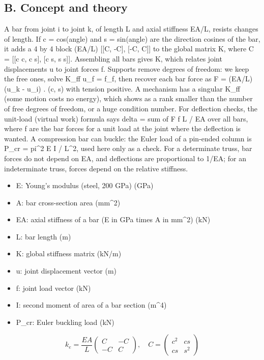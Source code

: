 \documentclass[11pt,a4paper]{article}
\begin{document}
\subsection*{B. Concept and theory}
A bar from joint i to joint k, of length L and axial stiffness EA/L, resists changes of length. If c = cos(angle) and s = sin(angle) are the direction cosines of the bar, it adds a 4 by 4 block (EA/L) [[C, -C], [-C, C]] to the global matrix K, where C = [[c c, c s], [c s, s s]]. Assembling all bars gives K, which relates joint displacements u to joint forces f. Supports remove degrees of freedom: we keep the free ones, solve K\_ff u\_f = f\_f, then recover each bar force as F = (EA/L) (u\_k - u\_i) . (c, s) with tension positive. A mechanism has a singular K\_ff (some motion costs no energy), which shows as a rank smaller than the number of free degrees of freedom, or a huge condition number. For deflection checks, the unit-load (virtual work) formula says delta = sum of F f L / EA over all bars, where f are the bar forces for a unit load at the joint where the deflection is wanted. A compression bar can buckle: the Euler load of a pin-ended column is P\_cr = pi\textasciicircum{}2 E I / L\textasciicircum{}2, used here only as a check. For a determinate truss, bar forces do not depend on EA, and deflections are proportional to 1/EA; for an indeterminate truss, forces depend on the relative stiffness.

\begin{itemize}[nosep]
\item E: Young's modulus (steel, 200 GPa) (GPa)
\item A: bar cross-section area (mm\textasciicircum{}2)
\item EA: axial stiffness of a bar (E in GPa times A in mm\textasciicircum{}2) (kN)
\item L: bar length (m)
\item K: global stiffness matrix (kN/m)
\item u: joint displacement vector (m)
\item f: joint load vector (kN)
\item I: second moment of area of a bar section (m\textasciicircum{}4)
\item P\_cr: Euler buckling load (kN)
\end{itemize}

\begin{equation*}
k_e=\frac{EA}{L}\begin{pmatrix}C&-C\\-C&C\end{pmatrix},\quad C=\begin{pmatrix}c^2&cs\\cs&s^2\end{pmatrix}
\end{equation*}
\end{document}

